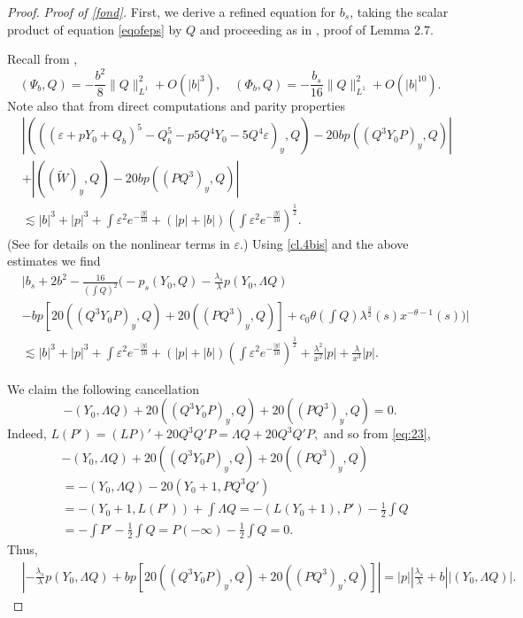 \documentclass[11pt,a4paper,reqno]{amsart}
\theoremstyle{remark}
\numberwithin{equation}{section}
\newcommand{\be}{\begin{equation}}
\newcommand{\ee}{\end{equation}}
\def\e{\varepsilon}
\def\lsl{\frac{\lambda_s}{\lambda}}
\def\l{\lambda}
\def\lsl{\frac{\lambda_s}{\lambda}}
\def\Yz{Y_0}
\begin{document}
\begin{proof}
\medskip

\emph{Proof of \eqref{fond}.}
First, we derive a refined equation for $b_s$, taking the scalar product of equation \eqref{eqofeps} by $Q$ and proceeding as   in \cite{MMR1},  proof of Lemma 2.7.

Recall from \cite{MMR1},
$$(\Psi_b,Q)= -\frac {b^2}{8} \|Q\|_{L^1}^2 + O(|b|^3),\quad  (\Phi_b, Q) = -\frac {b_s}{16} \|Q\|_{L^1}^2 +O(|b|^{10}).
$$
Note also that from direct computations and parity properties
\begin{align*}
&\left|\left( ((\e+p\Yz + Q_b)^5 - Q_b^5 - p5Q^4 \Yz - 5Q^4 \e)_y,Q\right)
- 20 bp((Q^3\Yz P )_y,Q) \right| \\
&+ \left| \left((\widetilde W)_y,Q\right)-20 bp (( P Q^3)_y,Q)\right|\\
& \lesssim  |b|^3 +|p|^3 + \int \varepsilon^2 {e^{-\frac{|y|}{10}}} 
+ (|p|+|b|) \left(\int \varepsilon^2 {e^{-\frac{|y|}{10}}} \right)^{\frac 12} 
  .
\end{align*}
(See \cite{MMR1} for details on the nonlinear terms in $\e$.)
Using   \eqref{cl.4bis} and 
the above estimates
we find\begin{align}
&\bigg| b_s + 2b^2  - \frac {16}{(\int Q)^2} \bigg( -  p_s (\Yz,Q)  - \lsl p 
 (\Yz,\Lambda Q)  \nonumber\\
&  -  bp \left[ 20 ((Q^3\Yz P)_y,Q) + 20 ((PQ^3)_y,Q) \right]
 + c_0 \theta \left(\int Q\right) \l^{\frac 32}(s) x^{-\theta-1}(s) \bigg)\bigg|\\
& \lesssim |b|^3+  |p|^3 +\int \varepsilon^2 {e^{-\frac{|y|}{10}}} +(|p|+|b|) \left(\int \varepsilon^2 {e^{-\frac{|y|}{10}}} \right)^{\frac 12} 
 +\frac {\l^2}{x^2} |p|+\frac {\l}{x^3} |p|.\label{eq:bautre}
\end{align}

We claim  the following cancellation
\be\label{cancel}
- (\Yz,\Lambda Q) + 20 ((Q^3\Yz P)_y,Q) + 20 ((PQ^3)_y,Q) =0.
\ee
Indeed, 
$L(P')= (LP)' + 20 Q^3 Q' P = \Lambda Q + 20 Q^3 Q' P,$
and so from \eqref{eq:23},
\begin{align*}
& - (\Yz,\Lambda Q) + 20 ((Q^3\Yz P)_y,Q) + 20 ((PQ^3)_y,Q) 
\\ &= - (\Yz,\Lambda Q)-  20 (\Yz+1,PQ^3 Q')\\
& = - (\Yz+1 , L(P')) + \int \Lambda Q = - (L(\Yz+1),P') - \frac 12 \int Q
\\ & = - \int P' -  \frac 12 \int Q  =  P(-\infty) - \frac 12 \int Q =0.
\end{align*}
Thus,
\begin{align*}
& \left| 
 - \lsl p 
 (\Yz,\Lambda Q) +  bp \left[ 20 ((Q^3\Yz P)_y,Q) + 20 ((PQ^3)_y,Q) \right]
\right|  = 
|p| \left| \lsl+b \right|  |(\Yz,\Lambda Q)|.
\end{align*}


\end{proof}
\end{document}
